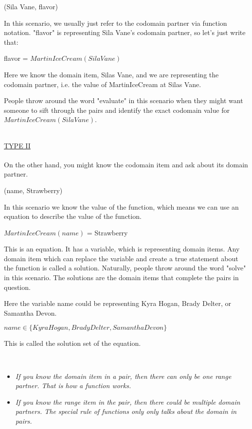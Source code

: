 \documentclass{ximera}
\begin{document}
\begin{center}
(Sila Vane, flavor)
\end{center}


In this scenario, we usually just refer to the codomain partner via function notation. "flavor" is representing Sila Vane's codomain partner, so let's just write that:
\begin{center}
flavor = $MartinIceCream(Sila Vane)$
\end{center}

Here we know the domain item, Silas Vane, and we are representing the codomain partner, i.e. the value of MartinIceCream at Silas Vane.  

People throw around the word "evaluate" in this scenario when they might want someone to sift through the pairs and identify the exact codomain value for $MartinIceCream(Sila Vane)$.

\quad \\
\underline{TYPE II} \\
\quad \\

On the other hand, you might know the codomain item and ask about its domain partner.
\begin{center}
(name, Strawberry)
\end{center}

In this scenario we know the value of the function, which means we can use an equation to describe the value of the function.
\begin{center}
$MartinIceCream(name)$ = Strawberry 
\end{center}


This is an equation.  It has a variable, which is representing domain items. Any domain item which can replace the variable and create a true statement about the function is called a solution.  Naturally, people throw around the word "solve" in this scenario. The solutions are the domain items that complete the pairs in question.

Here the variable name could be representing Kyra Hogan, Brady Delter, or Samantha Devon.


$name \in \{ Kyra Hogan, Brady Delter, Samantha Devon \}$

This is called the solution set of the equation.


\quad \\

\begin{itemize}
\item \textit{If you know the domain item in a pair, then there can only be one range partner.  That is how a function works.}

\item \textit{If you know the range item in the pair, then there could be multiple domain partners. The special rule of functions only only talks about the domain in pairs.}
\end{itemize}
\end{document}

